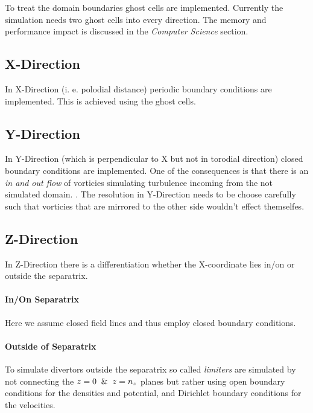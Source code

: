 To treat the domain boundaries ghost cells are implemented. Currently the simulation needs two ghost cells into every direction. The memory and performance impact is discussed in the \textit{Computer Science} section.
\subsection{X-Direction}
In X-Direction (i. e. polodial distance) periodic boundary conditions are implemented. This is achieved using the ghost cells. 
\subsection{Y-Direction}
In Y-Direction (which is perpendicular to X but not in torodial direction) closed boundary conditions are implemented. One of the consequences is that there is an \textit{in and out flow} of vorticies simulating turbulence incoming from the not simulated domain. . The resolution in Y-Direction needs to be choose carefully such that vorticies that are mirrored to the other side wouldn't effect themselfes. 
\subsection{Z-Direction}
In Z-Direction there is a differentiation whether the X-coordinate lies in/on or outside the separatrix.
\paragraph{In/On Separatrix}
Here we assume closed field lines and thus employ closed boundary conditions.
\paragraph{Outside of Separatrix}
To simulate  divertors outside the separatrix so called \textit{limiters} are simulated by not connecting the $z=0 \And z=n_z$ planes but rather using open boundary conditions for the densities and potential, and Dirichlet boundary conditions for the velocities.  

